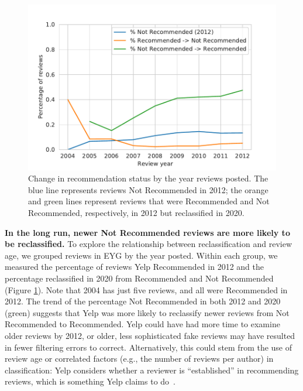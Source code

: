 \begin{figure}[t]
    \centering
    \includegraphics[width=0.9\columnwidth]{chapters/reviews/figures/filtering_changes.pdf}
        \caption[Change in recommendation status by the year reviews posted]{Change in recommendation status by the year reviews posted. The blue line represents reviews Not Recommended in 2012; the orange and green lines represent reviews that were Recommended and Not Recommended, respectively, in 2012 but reclassified in 2020.
    }
    \label{fig:filtered_change}
\end{figure}

\textbf{In the long run, newer Not Recommended reviews are more likely to be reclassified.} To explore the relationship between reclassification and review age, we grouped reviews in EYG by the year posted. Within each group, we measured the percentage of reviews Yelp Recommended in 2012 and the percentage reclassified in 2020 from Recommended and Not Recommended (Figure \ref{fig:filtered_change}). Note that 2004 has just five reviews, and all were Recommended in 2012. The trend of the percentage Not Recommended in both 2012 and 2020 (green) suggests that Yelp was more likely to reclassify newer reviews from Not Recommended to Recommended. Yelp could have had more time to examine older reviews by 2012, or older, less sophisticated fake reviews may have resulted in fewer filtering errors to correct. Alternatively, this could stem from the use of review age or correlated factors (e.g., the number of reviews per author) in classification: Yelp considers whether a reviewer is ``established'' in recommending reviews, which is something Yelp claims to do~\cite{yelpwhyrec,yelprecommendationsoftware}.

